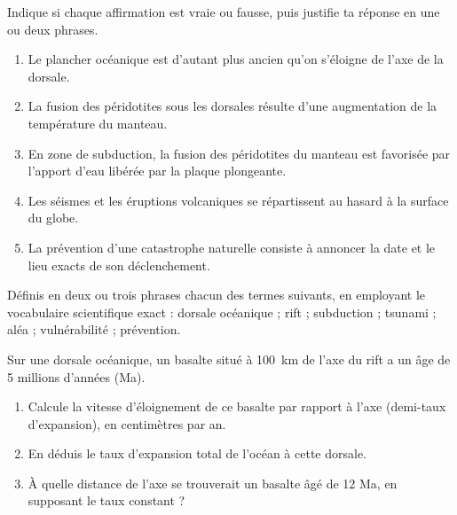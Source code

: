 \documentclass[11pt]{article}
\newcommand{\cle}[1]{{\popxbold\color{popdark}#1}}
\newcounter{popsec}
\newcounter{popsub}
\newcommand{\courssub}[1]{%
  \stepcounter{popsub}%
  \par\vspace{9pt}\noindent{\popxbold\fontsize{11.5}{13}\selectfont\color{popink}{\color{poporange}\thepopsec.\thepopsub}\hspace{6pt}#1}\par\nopagebreak\vspace{4pt}
}
\begin{document}
\begin{exercice}
Indique si chaque affirmation est vraie ou fausse, puis justifie ta réponse en une ou deux phrases.
\begin{enumerate}
\item Le plancher océanique est d'autant plus ancien qu'on s'éloigne de l'axe de la dorsale.
\item La fusion des péridotites sous les dorsales résulte d'une augmentation de la température du manteau.
\item En zone de subduction, la fusion des péridotites du manteau est favorisée par l'apport d'eau libérée par la plaque plongeante.
\item Les séismes et les éruptions volcaniques se répartissent au hasard à la surface du globe.
\item La prévention d'une catastrophe naturelle consiste à annoncer la date et le lieu exacts de son déclenchement.
\end{enumerate}
\end{exercice}

\begin{exercice}[Définitions]
Définis en deux ou trois phrases chacun des termes suivants, en employant le vocabulaire scientifique exact : \cle{dorsale océanique} ; \cle{rift} ; \cle{subduction} ; \cle{tsunami} ; \cle{aléa} ; \cle{vulnérabilité} ; \cle{prévention}.
\end{exercice}

\begin{exercice}
Sur une dorsale océanique, un basalte situé à \SI{100}{km} de l'axe du rift a un âge de 5 millions d'années (Ma).
\begin{enumerate}
\item Calcule la vitesse d'éloignement de ce basalte par rapport à l'axe (demi-taux d'expansion), en centimètres par an.
\item En déduis le taux d'expansion total de l'océan à cette dorsale.
\item À quelle distance de l'axe se trouverait un basalte âgé de 12 Ma, en supposant le taux constant ?
\end{enumerate}
\end{exercice}

\courssub{Je m'entraîne}
\end{document}
